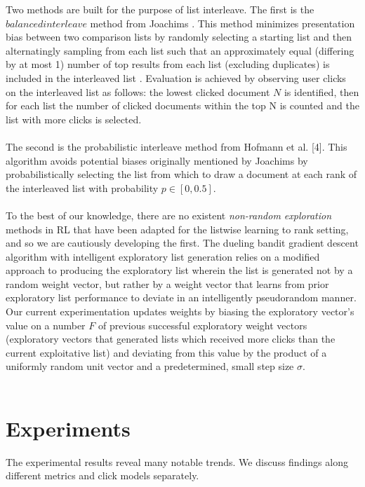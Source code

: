 \documentclass{acm_proc_article-sp}
\begin{document}
Two methods are built for the purpose of list interleave. The first is the $balanced interleave$ method from Joachims \cite{joachims}. This method minimizes presentation bias between two comparison lists by randomly selecting a starting list and then alternatingly sampling from each list such that an approximately equal (differing by at most 1) number of top results from each list (excluding duplicates) is included in the interleaved list \cite{joachims}. Evaluation is achieved by observing user clicks on the interleaved list as follows: the lowest clicked document $N$ is identified, then for each list the number of clicked documents within the top N is counted and the list with more clicks is selected. \\ \\
The second is the probabilistic interleave method from Hofmann et al. [4]. This algorithm avoids potential biases originally mentioned by Joachims \cite{joachims} by probabilistically selecting the list from which to draw a document at each rank of the interleaved list with probability $p \in  [0, 0.5]$\cite{hofmann}. \\ \\
To the best of our knowledge, there are no existent \emph{non-random exploration} methods in RL that have been adapted for the listwise learning to rank setting, and so we are cautiously developing the first. The dueling bandit gradient descent algorithm with intelligent exploratory list generation relies on a modified approach to producing the exploratory list wherein the list is generated not by a random weight vector, but rather by a weight vector that learns from prior exploratory list performance to deviate in an intelligently pseudorandom manner. Our current experimentation updates weights by biasing the exploratory vector's value on a number $F$ of previous successful exploratory weight vectors (exploratory vectors that generated lists which received more clicks than the current exploitative list) and deviating from this value by the product of a uniformly random unit vector and a predetermined, small step size $\sigma$. \\ \\

\section{Experiments}
The experimental results reveal many notable trends.  We discuss findings along different metrics and click models separately.
\end{document}
